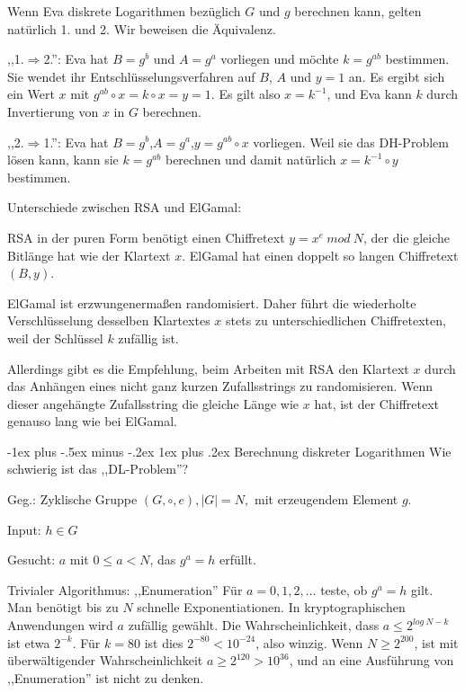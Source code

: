 \documentclass[a4paper]{article}
\makeatletter
\renewcommand{\subsubsection}{\@startsection{subsubsection}{3}{0mm}%
 {-1ex plus -.5ex minus -.2ex}%
 {1ex plus .2ex}%
 {\normalfont\small\bfseries}}
\makeatother
\begin{document}
\begin{multicols}{3}
        Wenn Eva diskrete Logarithmen bezüglich $G$ und $g$ berechnen kann, gelten natürlich 1. und 2. Wir beweisen die Äquivalenz.
        \begin{itemize*}
            \item ,,1.$\Rightarrow$2.'': Eva hat $B=g^b$ und $A=g^a$ vorliegen und möchte $k=g^{ab}$ bestimmen. Sie wendet ihr Entschlüsselungsverfahren auf $B$, $A$ und $y=1$ an. Es ergibt sich ein Wert $x$ mit $g^{ab}\circ x=k\circ x=y=1$. Es gilt also $x=k^{-1}$, und Eva kann $k$ durch Invertierung von $x$ in $G$ berechnen.
            \item ,,2.$\Rightarrow$1.'': Eva hat $B=g^b$,$A=g^a$,$y=g^{ab}\circ x$ vorliegen. Weil sie das DH-Problem lösen kann, kann sie $k=g^{ab}$ berechnen und damit natürlich $x=k^{-1}\circ y$ bestimmen.
        \end{itemize*}

        Unterschiede zwischen RSA und ElGamal:
        \begin{itemize*}
            \item RSA in der puren Form benötigt einen Chiffretext $y=x^e\ mod\ N$, der die gleiche Bitlänge hat wie der Klartext $x$. ElGamal hat einen doppelt so langen Chiffretext $(B,y)$.
            \item ElGamal ist erzwungenermaßen randomisiert. Daher führt die wiederholte Verschlüsselung desselben Klartextes $x$ stets zu unterschiedlichen Chiffretexten, weil der Schlüssel $k$ zufällig ist.
        \end{itemize*}

        Allerdings gibt es die Empfehlung, beim Arbeiten mit RSA den Klartext $x$ durch das Anhängen eines nicht ganz kurzen Zufallsstrings zu randomisieren. Wenn dieser angehängte Zufallsstring die gleiche Länge wie $x$ hat, ist der Chiffretext genauso lang wie bei ElGamal.

        \subsubsection{Berechnung diskreter Logarithmen}
        Wie schwierig ist das ,,DL-Problem''?

        Geg.: Zyklische Gruppe $(G,\circ,e),|G|=N,$ mit erzeugendem Element $g$.

        Input: $h\in G$

        Gesucht: $a$ mit $0\leq a<N$, das $g^a=h$ erfüllt.

        Trivialer Algorithmus: ,,Enumeration''
        Für $a=0,1,2 ,...$ teste, ob $g^a=h$ gilt. Man benötigt bis zu $N$ schnelle Exponentiationen. In kryptographischen Anwendungen wird $a$ zufällig gewählt. Die Wahrscheinlichkeit, dass $a\leq 2^{log\ N-k}$ ist etwa $2^{-k}$. Für $k= 80$ ist dies $2^{-80}< 10^{-24}$, also winzig. Wenn $N\geq 2^{200}$, ist mit überwältigender Wahrscheinlichkeit $a\geq 2^{120}> 10^{36}$, und an eine Ausführung von ,,Enumeration'' ist nicht zu denken.


\end{multicols}
\end{document}
